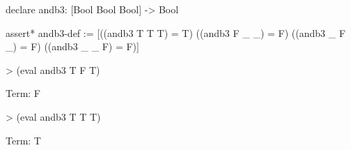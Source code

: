 %
%
\begin{tcAthena}
declare andb3: [Bool Bool Bool] -> Bool

assert* andb3-def := [((andb3 T T T) = T)
                      ((andb3 F _ _) = F)
                      ((andb3 _ F _) = F)
                      ((andb3 _ _ F) = F)]

> (eval andb3 T F T)

Term: F

> (eval andb3 T T T)

Term: T
\end{tcAthena}
